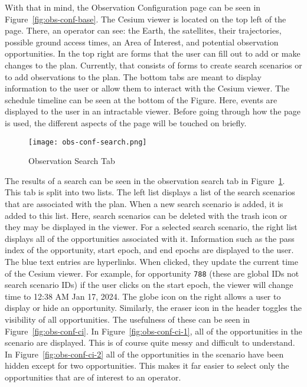 With that in mind, the Observation Configuration page can be seen in
Figure~\ref{fig:obs-conf-base}. The Cesium viewer is located on the top left of
the page.  There, an operator can see: the Earth, the satellites, their
trajectories, possible ground access times, an Area of Interest, and potential
observation opportunities. In the top right are forms that the user can fill
out to add or make changes to the plan. Currently, that consists of forms to
create search scenarios or to add observations to the plan. The bottom tabs are
meant to display information to the user or allow them to interact with the
Cesium viewer. The schedule timeline can be seen at the bottom of the Figure.
Here, events are displayed to the user in an intractable viewer. Before going
through how the page is used, the different aspects of the page will be touched
on briefly. 


\begin{figure}[h]
    \centering
    \texttt{[image: obs-conf-search.png]} 
    \caption{Observation Search Tab}
    \label{fig:obs-conf-search} 
\end{figure}

The results of a search can be seen in the observation search tab in
Figure~\ref{fig:obs-conf-search}. This tab is split into two lists. The left
list displays a list of the search scenarios that are associated with the plan.
When a new search scenario is added, it is added to this list. Here, search
scenarios can be deleted with the trash icon or they may be displayed in the
viewer. For a selected search scenario, the right list displays all of the
opportunities associated with it. Information such as the pass index of the
opportunity, start epoch, and end epochs are displayed to the user. The blue
text entries are hyperlinks. When clicked, they update the current time of the
Cesium viewer. For example, for opportunity \texttt{788} (these are global IDs
not search scenario IDs) if the user clicks on the start epoch, the viewer will
change time to 12:38 AM Jan 17, 2024. The globe icon on the right allows a user
to display or hide an opportunity. Similarly, the eraser icon in the header
toggles the visibility of all opportunities.  The usefulness of these can be
seen in Figure~\ref{fig:obs-conf-ci}.  In Figure~\ref{fig:obs-conf-ci-1},
all of the opportunities in the scenario are displayed. This is of course quite
messy and difficult to understand. In Figure~\ref{fig:obs-conf-ci-2} all of
the opportunities in the scenario have been hidden except for two
opportunities. This makes it far easier to select only the opportunities that
are of interest to an operator.


